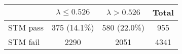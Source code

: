 \begin{tabular}{lccc}
\toprule
 & $\lambda \leq 0.526$ & $\lambda > 0.526$ & Total\\
\midrule
STM pass & 375 (14.1\%) & 580 (22.0\%) & 955\\
STM fail & 2290 & 2051 & 4341\\
\bottomrule
\end{tabular}
